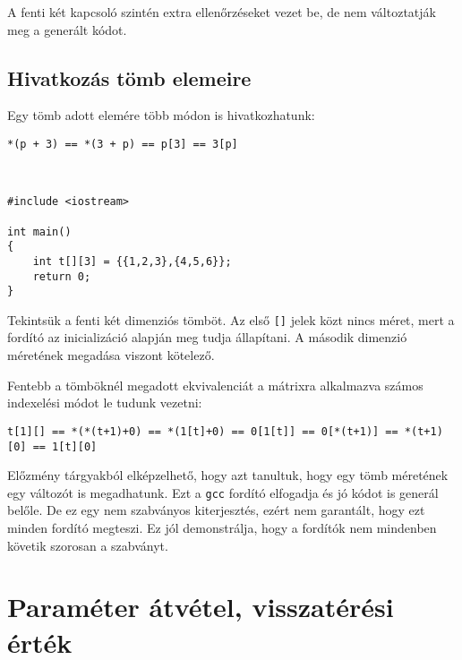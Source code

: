 \documentclass[a4paper,11.5pt,table]{article}
\begin{document}
	A fenti két kapcsoló szintén extra ellenőrzéseket vezet be, de nem változtatják meg a generált kódot.
	\subsection{Hivatkozás tömb elemeire}
	Egy tömb adott elemére több módon is hivatkozhatunk:
	
	{\centering \texttt{*(p + 3) == *(3 + p) == p[3] == 3[p]} \par}
	\
	\begin{lstlisting}
#include <iostream>

int main()
{
	int t[][3] = {{1,2,3},{4,5,6}};
	return 0;
}
	\end{lstlisting}
	Tekintsük a fenti két dimenziós tömböt. Az első \texttt{[]} jelek közt nincs méret, mert a fordító az inicializáció alapján meg tudja állapítani. A második dimenzió méretének megadása viszont kötelező.
	
	\medskip
	Fentebb a tömböknél megadott ekvivalenciát a mátrixra alkalmazva számos indexelési módot le tudunk vezetni:
	\medskip
	
	\begin{center}
		\texttt{t[1][] == *(*(t+1)+0) == *(1[t]+0) == 0[1[t]] == 0[*(t+1)] == *(t+1)[0] == 1[t][0] } 
		\end{center}
	\begin{note}
		Előzmény tárgyakból elképzelhető, hogy azt tanultuk, hogy egy tömb méretének egy változót is megadhatunk. Ezt a \texttt{gcc} fordító elfogadja és jó kódot is generál belőle. De ez egy nem szabványos kiterjesztés, ezért nem garantált, hogy ezt minden fordító megteszi. Ez jól demonstrálja, hogy a fordítók nem mindenben követik szorosan a szabványt.
	\end{note}
	\section{Paraméter átvétel, visszatérési érték}
\end{document}
